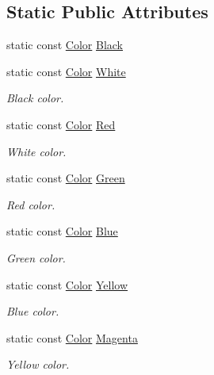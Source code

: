 \subsection*{Static Public Attributes}
\begin{DoxyCompactItemize}
\item 
static const \hyperlink{unionarcade_1_1_color}{Color} \hyperlink{unionarcade_1_1_color_adf9314b9d80e839db37907dc8e281175}{Black}
\item 
static const \hyperlink{unionarcade_1_1_color}{Color} \hyperlink{unionarcade_1_1_color_aa8bd809fbf902dbbe53b9bb6802eb57f}{White}
\begin{DoxyCompactList}\small\item\em Black color. \end{DoxyCompactList}\item 
static const \hyperlink{unionarcade_1_1_color}{Color} \hyperlink{unionarcade_1_1_color_a7101e34126fdb3c14d53045681938293}{Red}
\begin{DoxyCompactList}\small\item\em White color. \end{DoxyCompactList}\item 
static const \hyperlink{unionarcade_1_1_color}{Color} \hyperlink{unionarcade_1_1_color_aa7271d3c9e5fc07926979eaa610af7e4}{Green}
\begin{DoxyCompactList}\small\item\em Red color. \end{DoxyCompactList}\item 
static const \hyperlink{unionarcade_1_1_color}{Color} \hyperlink{unionarcade_1_1_color_a37e72a85b3ce04f4642a48cae2f60644}{Blue}
\begin{DoxyCompactList}\small\item\em Green color. \end{DoxyCompactList}\item 
static const \hyperlink{unionarcade_1_1_color}{Color} \hyperlink{unionarcade_1_1_color_aa437de4029652dba87b0b64ca488f8ff}{Yellow}
\begin{DoxyCompactList}\small\item\em Blue color. \end{DoxyCompactList}\item 
static const \hyperlink{unionarcade_1_1_color}{Color} \hyperlink{unionarcade_1_1_color_aabfdd84cadc61ca458e8122869310631}{Magenta}
\begin{DoxyCompactList}\small\item\em Yellow color. \end{DoxyCompactList}\item 

\end{DoxyCompactItemize}
